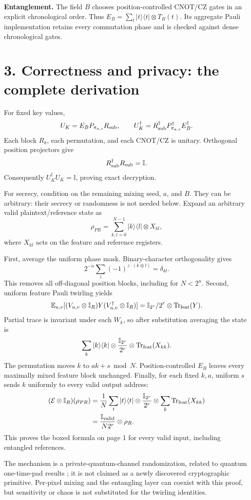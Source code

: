 \documentclass[11pt,a4paper]{article}
\newcommand{\ket}[1]{|#1\rangle}\newcommand{\bra}[1]{\langle#1|}
\newcommand{\E}{\mathbb E}\newcommand{\Id}{\mathbb I}
\newcommand{\tr}{\operatorname{Tr}}\newcommand{\xor}{\mathbin{\oplus}}
\begin{document}
\textbf{Entanglement.} The field \(B\) chooses position-controlled CNOT/CZ gates in an explicit chronological order. Thus \(E_B=\sum_t\ket t\bra t\otimes T_B(t)\). Its aggregate Pauli implementation retains every commutation phase and is checked against dense chronological gates.

\newpage
\section*{3. Correctness and privacy: the complete derivation}
For fixed key values,
\[
U_K=E_BP_{\pi_{a,s}}R_{\rm sub},\qquad
U_K^\dagger=R_{\rm sub}^\dagger P_{\pi_{a,s}}^\dagger E_B^\dagger .
\]
Each block \(R_k\), each permutation, and each CNOT/CZ is unitary. Orthogonal position projectors give
\[
R_{\rm sub}^\dagger R_{\rm sub}=\Id.
\]
Consequently \(U_K^\dagger U_K=\Id\), proving exact decryption.

For secrecy, condition on the remaining mixing seed, \(a\), and \(B\). They can be arbitrary: their secrecy or randomness is not needed below. Expand an arbitrary valid plaintext/reference state as
\[
\rho_{PR}=\sum_{k,l=0}^{N-1}\ket k\bra l\otimes X_{kl},
\]
where \(X_{kl}\) acts on the feature and reference registers.

First, average the uniform phase mask. Binary-character orthogonality gives
\[
2^{-n}\sum_z(-1)^{z\cdot(k\xor l)}=\delta_{kl}.
\]
This removes all off-diagonal position blocks, including for \(N<2^n\). Second, uniform feature Pauli twirling yields
\[
\E_{u,v}[(V_{u,v}\otimes\Id_R)Y(V_{u,v}^\dagger\otimes\Id_R)]
=\Id_{2^r}/2^r\otimes\tr_{\rm feat}(Y).
\]
Partial trace is invariant under each \(W_k\), so after substitution averaging the state is
\[
\sum_k\ket k\bra k\otimes\frac{\Id_{2^r}}{2^r}\otimes\tr_{\rm feat}(X_{kk}).
\]
The permutation moves \(k\) to \(ak+s\bmod N\). Position-controlled \(E_B\) leaves every maximally mixed feature block unchanged. Finally, for each fixed \(k,a\), uniform \(s\) sends \(k\) uniformly to every valid output address:
\begin{align*}
(\mathcal E\otimes\Id_R)(\rho_{PR})
&=\frac1N\sum_t\ket t\bra t\otimes\frac{\Id_{2^r}}{2^r}
  \otimes\sum_k\tr_{\rm feat}(X_{kk})\\
&=\frac{\Id_{\rm valid}}{N2^r}\otimes\rho_R .
\end{align*}
This proves the boxed formula on page 1 for every valid input, including entangled references.

The mechanism is a private-quantum-channel randomization, related to quantum one-time-pad results \cite{private}; it is not claimed as a newly discovered cryptographic primitive. Per-pixel mixing and the entangling layer can coexist with this proof, but sensitivity or chaos is not substituted for the twirling identities.
\end{document}
